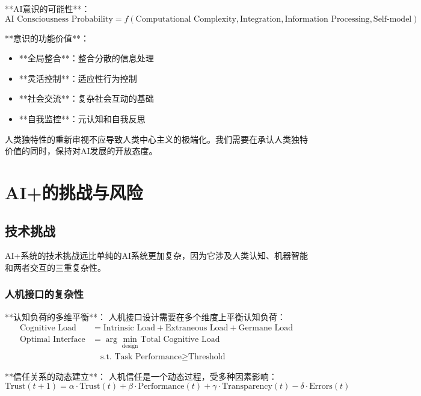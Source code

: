 **AI意识的可能性**：
\begin{equation}
\text{AI Consciousness Probability} = f(\text{Computational Complexity}, \text{Integration}, \text{Information Processing}, \text{Self-model})
\end{equation}

**意识的功能价值**：
\begin{itemize}
\item **全局整合**：整合分散的信息处理
\item **灵活控制**：适应性行为控制
\item **社会交流**：复杂社会互动的基础
\item **自我监控**：元认知和自我反思
\end{itemize}

\begin{center}
人类独特性的重新审视不应导致人类中心主义的极端化。我们需要在承认人类独特价值的同时，保持对AI发展的开放态度。
\end{center}

\section{AI+的挑战与风险}

\subsection{技术挑战}

AI+系统的技术挑战远比单纯的AI系统更加复杂，因为它涉及人类认知、机器智能和两者交互的三重复杂性。

\subsubsection{人机接口的复杂性} %

**认知负荷的多维平衡**：
人机接口设计需要在多个维度上平衡认知负荷：
\begin{align}
\text{Cognitive Load} &= \text{Intrinsic Load} + \text{Extraneous Load} + \text{Germane Load} \\
\text{Optimal Interface} &= \arg\min_{\text{design}} \text{Total Cognitive Load} \\
&\quad \text{s.t. } \text{Task Performance} \geq \text{Threshold}
\end{align}

**信任关系的动态建立**：
人机信任是一个动态过程，受多种因素影响：
\begin{equation}
\text{Trust}(t+1) = \alpha \cdot \text{Trust}(t) + \beta \cdot \text{Performance}(t) + \gamma \cdot \text{Transparency}(t) - \delta \cdot \text{Errors}(t)
\end{equation}

